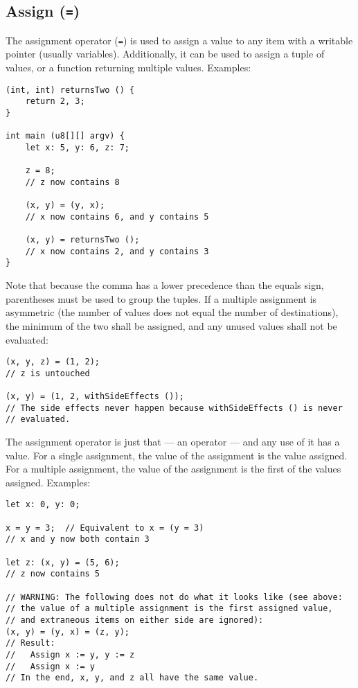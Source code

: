 \documentclass{article}
\begin{document}
\subsection{Assign (\texttt{=})}
\label{sub:operators:assign}
The assignment operator (\texttt{=}) is used to assign a value to any item with
a writable pointer (usually variables). Additionally, it can be used to assign
a tuple of values, or a function returning multiple values.
Examples:
\begin{verbatim}
(int, int) returnsTwo () {
    return 2, 3;
}

int main (u8[][] argv) {
    let x: 5, y: 6, z: 7;

    z = 8;
    // z now contains 8

    (x, y) = (y, x);
    // x now contains 6, and y contains 5

    (x, y) = returnsTwo ();
    // x now contains 2, and y contains 3
}
\end{verbatim}

Note that because the comma has a lower precedence than the equals sign,
parentheses must be used to group the tuples. If a multiple assignment is
asymmetric (the number of values does not equal the number of destinations),
the minimum of the two shall be assigned, and any unused values shall not be
evaluated:
\begin{verbatim}
(x, y, z) = (1, 2);
// z is untouched

(x, y) = (1, 2, withSideEffects ());
// The side effects never happen because withSideEffects () is never
// evaluated.
\end{verbatim}

The assignment operator is just that --- an operator --- and any use of it has
a value. For a single assignment, the value of the assignment is the value
assigned. For a multiple assignment, the value of the assignment is the first
of the values assigned. Examples:
\begin{verbatim}
let x: 0, y: 0;

x = y = 3;  // Equivalent to x = (y = 3)
// x and y now both contain 3

let z: (x, y) = (5, 6);
// z now contains 5

// WARNING: The following does not do what it looks like (see above:
// the value of a multiple assignment is the first assigned value,
// and extraneous items on either side are ignored):
(x, y) = (y, x) = (z, y);
// Result:
//   Assign x := y, y := z
//   Assign x := y
// In the end, x, y, and z all have the same value.
\end{verbatim}
\end{document}
